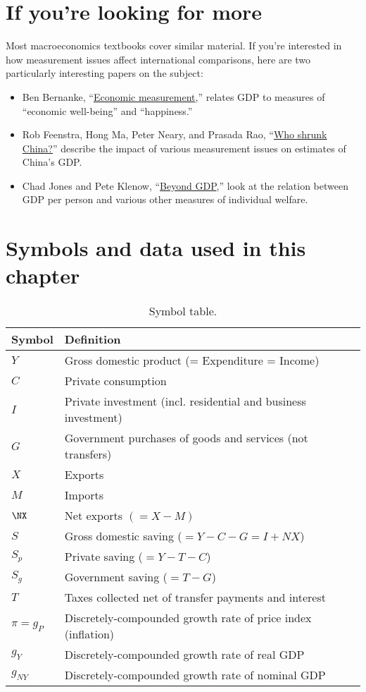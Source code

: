\section*{If you're looking for more}

Most macroeconomics textbooks cover similar material.
If you're interested in how measurement issues affect
international comparisons, here are two
particularly interesting papers on the subject:
%
\begin{itemize}
\item Ben Bernanke,
``\href{http://www.federalreserve.gov/newsevents/speech/bernanke20120806a.htm}{Economic measurement},''
    relates GDP to measures of ``economic well-being'' and ``happiness.''

\item Rob Feenstra, Hong Ma, Peter Neary, and Prasada Rao,
``\href{http://papers.nber.org/papers/w17729}{Who shrunk China?}''
describe the impact of various measurement issues on
estimates of China's GDP.

\item Chad Jones and Pete Klenow,
``\href{http://klenow.com/Jones_Klenow.pdf}{Beyond GDP},''
look at the relation between GDP per person and
various other measures of individual welfare.
\end{itemize}


\section*{Symbols and data used in this chapter}

\begin{table}[H]
\centering
\caption{Symbol table.}
\begin{tabular*}{0.99\textwidth}{l@{\extracolsep{\fill}}l}
\toprule
Symbol &  Definition\\
\midrule
$Y$        &Gross domestic product (= Expenditure = Income)\\
$C$        &Private consumption\\
$I$        &Private investment (incl. residential and business investment)\\
$G$        &Government purchases of goods and services (not transfers)\\
$X$        &Exports\\
$M$        &Imports\\
$\NX$    &Net exports $(=X-M)$\\
$S$        &Gross domestic saving ($=Y-C-G=I+NX$)\\
$S_p$    &Private saving ($=Y-T-C$)\\
$S_g$    &Government saving ($=T-G$)\\
$T$        &Taxes collected net of transfer payments and interest\\
$ \pi = g_{P}$    &Discretely-compounded growth rate of price index (inflation)\\
$ g_{Y}$    &Discretely-compounded growth rate of real GDP\\
$ g_{NY}$    &Discretely-compounded growth rate of nominal GDP\\
\bottomrule
\end{tabular*}
\end{table}


